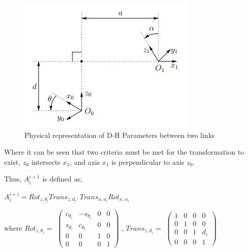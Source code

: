 \documentclass[12pt,openany,a4paper]{book}
\begin{document}
\begin{center}
\begin{figure}[htb]
  \includegraphics[width=0.5\linewidth]{DH_Parameters_figure.jpg}
\caption{Physical representation of D-H Parameters between two links}
\end{figure}
\end{center}

Where it can be seen that two criteria must be met for the transformation to exist, $z_0$ intersects $x_1$, and axis $x_1$ is perpendicular to axis $z_0$.

\vspace{\baselineskip}
Thus, $A_{i}^{i+1}$ is defined as;

\vspace{\baselineskip}
$A_{i}^{i+i} = Rot_{z,\theta_i} Trans_{z, d_i}, Trans_{x, a_i} Rot_{x, \alpha_i}$

where
\vspace{\baselineskip}
$Rot_{z,\theta_i} =$
$
 \left(\begin{array}{cccc} c_{\theta_i} & -s_{\theta_i} & 0 & 0\\ s_{\theta_i} & c_{\theta_i} & 0 & 0\\ 0 & 0 & 1 & 0\\ 0 & 0 & 0 & 1 \end{array}\right)
$
, 
$Trans_{z, d_i} =$
$
 \left(\begin{array}{cccc} 1 & 0 & 0 & 0\\ 0 & 1 & 0 & 0\\ 0 & 0 & 1 & d_i\\ 0 & 0 & 0 & 1 \end{array}\right)
$

\vspace{\baselineskip}
\end{document}
